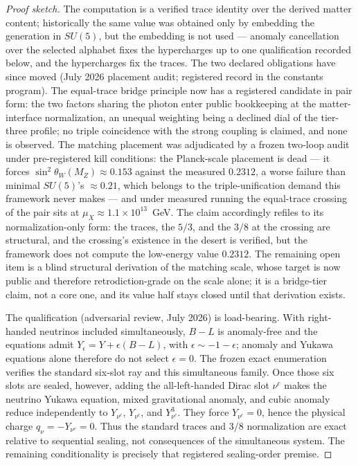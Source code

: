 \documentclass[11pt]{article}
\theoremstyle{plain}
\theoremstyle{definition}
\theoremstyle{remark}
\newenvironment{proofsketch}{\begin{proof}[Proof sketch]}{\end{proof}}
\begin{document}
\begin{proofsketch}
The computation is a verified trace identity over the derived matter content; historically the same value was obtained only by embedding the generation in \(SU(5)\), but the embedding is not used --- anomaly cancellation over the selected alphabet fixes the hypercharges up to one qualification recorded below, and the hypercharges fix the traces. The two declared obligations have since moved (July 2026 placement audit; registered record in the constants program). The equal-trace bridge principle now has a registered candidate in pair form: the two factors sharing the photon enter public bookkeeping at the matter-interface normalization, an unequal weighting being a declined dial of the tier-three profile; no triple coincidence with the strong coupling is claimed, and none is observed. The matching placement was adjudicated by a frozen two-loop audit under pre-registered kill conditions: the Planck-scale placement is dead --- it forces \(\sin^2\theta_W(M_Z)\approx 0.153\) against the measured \(0.2312\), a worse failure than minimal \(SU(5)\)'s \(\approx 0.21\), which belongs to the triple-unification demand this framework never makes --- and under measured running the equal-trace crossing of the pair sits at \(\mu_X \approx 1.1\times10^{13}\)~GeV. The claim accordingly refiles to its normalization-only form: the traces, the \(5/3\), and the \(3/8\) at the crossing are structural, and the crossing's existence in the desert is verified, but the framework does not compute the low-energy value \(0.2312\). The remaining open item is a blind structural derivation of the matching scale, whose target is now public and therefore retrodiction-grade on the scale alone; it is a bridge-tier claim, not a core one, and its value half stays closed until that derivation exists.

The qualification (adversarial review, July 2026) is load-bearing. With right-handed neutrinos included simultaneously, \(B-L\) is anomaly-free and the equations admit \(Y_\epsilon=Y+\epsilon(B-L)\), with \(\epsilon\sim-1-\epsilon\); anomaly and Yukawa equations alone therefore do not select \(\epsilon=0\). The frozen exact enumeration verifies the standard six-slot ray and this simultaneous family. Once those six slots are sealed, however, adding the all-left-handed Dirac slot \(\nu^c\) makes the neutrino Yukawa equation, mixed gravitational anomaly, and cubic anomaly reduce independently to \(Y_{\nu^c}\), \(Y_{\nu^c}\), and \(Y_{\nu^c}^3\). They force \(Y_{\nu^c}=0\), hence the physical charge \(q_\nu=-Y_{\nu^c}=0\). Thus the standard traces and \(3/8\) normalization are exact relative to sequential sealing, not consequences of the simultaneous system. The remaining conditionality is precisely that registered sealing-order premise.
\end{proofsketch}
\end{document}

